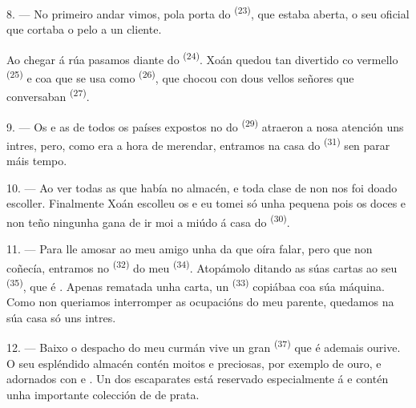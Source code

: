 8. --- No primeiro andar vimos, pola porta do 
\textsuperscript{(23)}, que estaba aberta, o seu oficial que cortaba o pelo a un
cliente.

Ao chegar á rúa pasamos diante do  \textsuperscript{(24)}. Xoán quedou
tan divertido co  vermello \textsuperscript{(25)} e coa  que se usa como  \textsuperscript{(26)}, que chocou con dous
vellos señores que conversaban  \textsuperscript{(27)}.

\VUsaut{3.0mm}

9. --- Os  e as  de todos os países expostos
no  do  \textsuperscript{(29)} atraeron a nosa
atención uns intres, pero, como era a hora de merendar, entramos na casa do
 \textsuperscript{(31)} sen parar máis tempo.

10. --- Ao ver todas as  que había no almacén,  e toda clase de  non nos foi doado escoller.
Finalmente Xoán escolleu os  e eu tomei só unha pequena
 pois os doces  e non teño
ningunha gana de ir moi a miúdo á casa do  \textsuperscript{(30)}.

\VUsaut{3.0mm}

11. --- Para lle amosar ao meu amigo unha  da que oíra
falar, pero que non coñecía, entramos no  \textsuperscript{(32)} do
meu  \textsuperscript{(34)}. Atopámolo ditando as súas cartas ao seu
 \textsuperscript{(35)}, que é . Apenas
rematada unha carta, un  \textsuperscript{(33)} copiábaa coa súa
máquina. Como non queriamos interromper as ocupacións do meu parente, quedamos na súa
casa só uns intres.

12. --- Baixo o despacho do meu curmán vive un gran 
\textsuperscript{(37)} que é ademais ourive. O seu espléndido almacén contén moitos
  e
 preciosas, por exemplo  
de ouro,  e  adornados con  e
. Un dos escaparates está reservado especialmente á
 e contén unha importante colección de  de prata.


